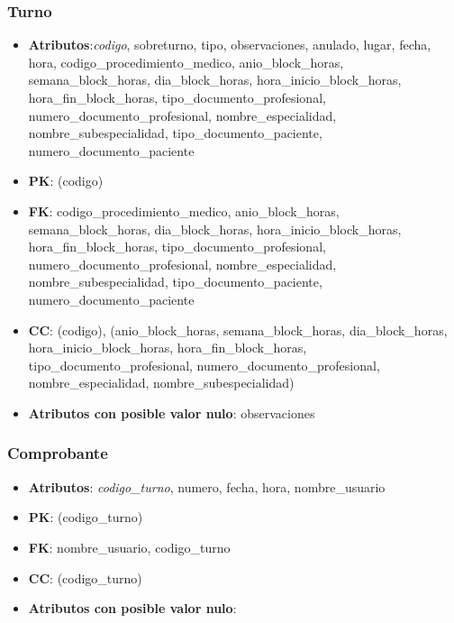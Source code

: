 \documentclass[a4paper,11pt]{article}
\begin{document}
\subsubsection{\textbf{Turno}}

\begin{itemize}

\item 
\textbf{Atributos}:\emph{codigo}, sobreturno, tipo, observaciones, anulado, lugar, fecha, hora,  codigo\_procedimiento\_medico, 
anio\_block\_horas, semana\_block\_horas, dia\_block\_horas, hora\_inicio\_block\_horas, hora\_fin\_block\_horas,
tipo\_documento\_profesional, numero\_documento\_profesional, nombre\_especialidad, 
nombre\_subespecialidad, tipo\_documento\_paciente, numero\_documento\_paciente

\item 
\textbf{PK}: (codigo)

\item
\textbf{FK}: codigo\_procedimiento\_medico, 
anio\_block\_horas, semana\_block\_horas, dia\_block\_horas, hora\_inicio\_block\_horas, hora\_fin\_block\_horas,
tipo\_documento\_profesional, numero\_documento\_profesional, nombre\_especialidad,
nombre\_subespecialidad, tipo\_documento\_paciente, numero\_documento\_paciente

\item 
\textbf{CC}: (codigo), 
(anio\_block\_horas, semana\_block\_horas, dia\_block\_horas, hora\_inicio\_block\_horas, hora\_fin\_block\_horas,
tipo\_documento\_profesional, numero\_documento\_profesional, nombre\_especialidad, 
nombre\_subespecialidad)

\item 
\textbf{Atributos con posible valor nulo}: observaciones

\end{itemize}
\subsubsection{\textbf{Comprobante}}

\begin{itemize}

\item 
\textbf{Atributos}: \emph{codigo\_turno}, numero, fecha, hora, nombre\_usuario

\item 
\textbf{PK}: (codigo\_turno)

\item
\textbf{FK}:  nombre\_usuario, codigo\_turno

\item 
\textbf{CC}: (codigo\_turno)

\item 
\textbf{Atributos con posible valor nulo}: 

\end{itemize}
\end{document}
